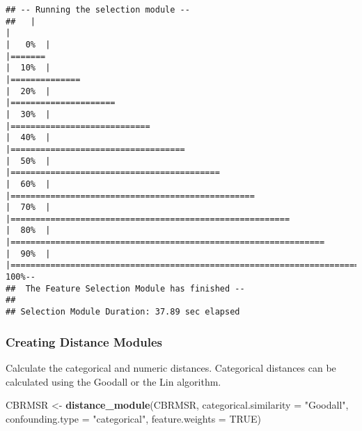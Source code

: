 \documentclass[
]{article}
\newenvironment{Shaded}{\begin{snugshade}}{\end{snugshade}}
\newcommand{\DataTypeTok}[1]{\textcolor[rgb]{0.13,0.29,0.53}{#1}}
\newcommand{\KeywordTok}[1]{\textcolor[rgb]{0.13,0.29,0.53}{\textbf{#1}}}
\newcommand{\NormalTok}[1]{#1}
\newcommand{\OtherTok}[1]{\textcolor[rgb]{0.56,0.35,0.01}{#1}}
\newcommand{\StringTok}[1]{\textcolor[rgb]{0.31,0.60,0.02}{#1}}
\begin{document}
\begin{verbatim}
## -- Running the selection module -- 
##   |                                                                              |                                                                      |   0%  |                                                                              |=======                                                               |  10%  |                                                                              |==============                                                        |  20%  |                                                                              |=====================                                                 |  30%  |                                                                              |============================                                          |  40%  |                                                                              |===================================                                   |  50%  |                                                                              |==========================================                            |  60%  |                                                                              |=================================================                     |  70%  |                                                                              |========================================================              |  80%  |                                                                              |===============================================================       |  90%  |                                                                              |======================================================================| 100%-- 
##  The Feature Selection Module has finished -- 
## 
## Selection Module Duration: 37.89 sec elapsed
\end{verbatim}

\hypertarget{creating-distance-modules}{%
\subsubsection{Creating Distance
Modules}\label{creating-distance-modules}}

Calculate the categorical and numeric distances. Categorical distances
can be calculated using the Goodall or the Lin algorithm.

\begin{Shaded}
\begin{Highlighting}[]
\NormalTok{CBRMSR <-}\StringTok{ }\KeywordTok{distance_module}\NormalTok{(CBRMSR, }\DataTypeTok{categorical.similarity =} \StringTok{"Goodall"}\NormalTok{, }\DataTypeTok{confounding.type =} \StringTok{"categorical"}\NormalTok{, }\DataTypeTok{feature.weights =} \OtherTok{TRUE}\NormalTok{)}
\end{Highlighting}
\end{Shaded}
\end{document}

